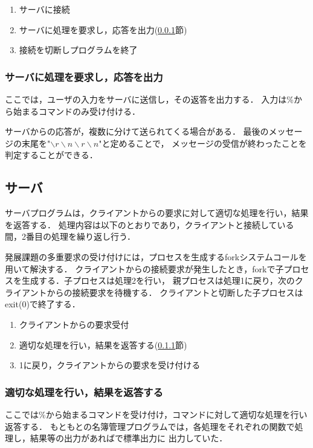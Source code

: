 \documentclass[11pt]{jarticle}
\begin{document}
\begin{enumerate}
    \item サーバに接続
    \item サーバに処理を要求し，応答を出力(\ref{sec:process}節)
    \item 接続を切断しプログラムを終了
\end{enumerate}

\subsubsection{サーバに処理を要求し，応答を出力} \label{sec:process}

ここでは，ユーザの入力をサーバに送信し，その返答を出力する．
入力は\%から始まるコマンドのみ受け付ける．

サーバからの応答が，複数に分けて送られてくる場合がある．
最後のメッセージの末尾を"$\backslash r\backslash n\backslash r\backslash n$"と定めることで，
メッセージの受信が終わったことを判定することができる．

\subsection{サーバ}

サーバプログラムは，クライアントからの要求に対して適切な処理を行い，結果を返答する．
処理内容は以下のとおりであり，クライアントと接続している間，2番目の処理を繰り返し行う．

発展課題の多重要求の受け付けには，プロセスを生成するforkシステムコールを用いて解決する．
クライアントからの接続要求が発生したとき，forkで子プロセスを生成する．子プロセスは処理2を行い，
親プロセスは処理1に戻り，次のクライアントからの接続要求を待機する．
クライアントと切断した子プロセスはexit(0)で終了する．

\begin{enumerate}
    \item クライアントからの要求受付
    \item 適切な処理を行い，結果を返答する(\ref{sec:response}節)
    \item 1に戻り，クライアントからの要求を受け付ける
\end{enumerate}


\subsubsection{適切な処理を行い，結果を返答する} \label{sec:response}

ここでは\%から始まるコマンドを受け付け，コマンドに対して適切な処理を行い返答する．
もともとの名簿管理プログラムでは，各処理をそれぞれの関数で処理し，結果等の出力があればで標準出力に
出力していた．
\end{document}
